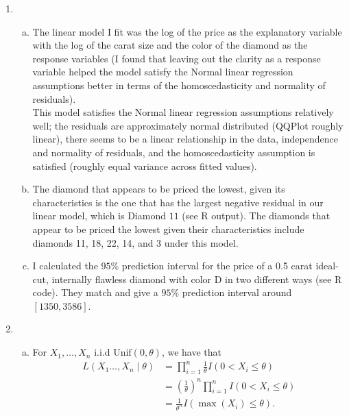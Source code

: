 \documentclass[11pt]{article}
\begin{document}
\begin{enumerate}
    \newpage

    \item \begin{enumerate}[a)]
        \item The linear model I fit was the log of the price as the explanatory variable with the log of the carat size and the color of the diamond as the response variables
        (I found that leaving out the clarity as a response variable helped the model satisfy the Normal linear regression assumptions better in terms of the homoscedasticity and normality of residuals). \\

        This model satisfies the Normal linear regression assumptions relatively well; the residuals are approximately normal distributed (QQPlot roughly linear),
        there seems to be a linear relationship in the data, independence and normality of residuals, and the homoscedasticity assumption is satisfied (roughly equal variance across
        fitted values).

        \item The diamond that appears to be priced the lowest, given its characteristics is the one that has the largest negative residual in our linear model, which is Diamond $11$ (see R output).
        The diamonds that appear to be priced the lowest given their characteristics include diamonds 11, 18, 22, 14, and 3 under this model.

        \item I calculated the $95\%$ prediction interval for the price of a 0.5 carat ideal-cut, internally flawless diamond with color D in two different ways (see R code). They match and give a $95\%$ prediction 
        interval around $\boxed{[1350, 3586]}$.
    \end{enumerate}

    \newpage

    \item \begin{enumerate}[a)]
        \item For $X_1, \dots, X_n$ i.i.d $\mathrm{Unif}(0, \theta)$, we have that
        \begin{align*}
            L(X_1 \dots, X_n \mid \theta) &= \prod_{i=1}^n \frac{1}{\theta} I(0 < X_i \leq \theta) \\
            &= \left(\frac{1}{\theta}\right)^n \prod_{i=1}^n I(0 < X_i \leq \theta) \\
            &= \frac{1}{\theta^n} I(\max (X_i) \leq \theta).
        \end{align*}


\end{enumerate}
\end{enumerate}
\end{document}
